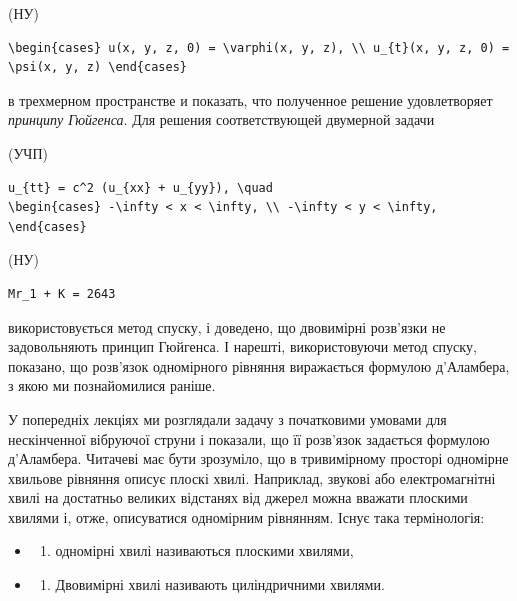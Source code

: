 \documentclass[
  ukrainian,
]{article}
\providecommand{\tightlist}{%
  \setlength{\itemsep}{0pt}\setlength{\parskip}{0pt}}
\begin{document}
(НУ)

\begin{verbatim}
\begin{cases} u(x, y, z, 0) = \varphi(x, y, z), \\ u_{t}(x, y, z, 0) = \psi(x, y, z) \end{cases}
\end{verbatim}

в трехмерном пространстве и показать, что полученное решение
удовлетворяет \emph{принципу Гюйгенса}. Для решения соответствующей
двумерной задачи

(УЧП)

\begin{verbatim}
u_{tt} = c^2 (u_{xx} + u_{yy}), \quad
\begin{cases} -\infty < x < \infty, \\ -\infty < y < \infty, \end{cases}
\end{verbatim}

(НУ)

\begin{verbatim}
Mr_1 + K = 2643
\end{verbatim}

використовується метод спуску, і доведено, що двовимірні розв'язки не
задовольняють принцип Гюйгенса. І нарешті, використовуючи метод спуску,
показано, що розв'язок одномірного рівняння виражається формулою
д'Аламбера, з якою ми познайомилися раніше.

У попередніх лекціях ми розглядали задачу з початковими умовами для
нескінченної вібруючої струни і показали, що її розв'язок задається
формулою д'Аламбера. Читачеві має бути зрозуміло, що в тривимірному
просторі одномірне хвильове рівняння описує плоскі хвилі. Наприклад,
звукові або електромагнітні хвилі на достатньо великих відстанях від
джерел можна вважати плоскими хвилями і, отже, описуватися одномірним
рівнянням. Існує така термінологія:

\begin{itemize}
\tightlist
\item
  \begin{enumerate}
  \def\labelenumi{\arabic{enumi})}
  \tightlist
  \item
    одномірні хвилі називаються плоскими хвилями,
  \end{enumerate}
\item
  \begin{enumerate}
  \def\labelenumi{\arabic{enumi})}
  \setcounter{enumi}{1}
  \tightlist
  \item
    Двовимірні хвилі називають циліндричними хвилями.
  \end{enumerate}
\end{itemize}
\end{document}

